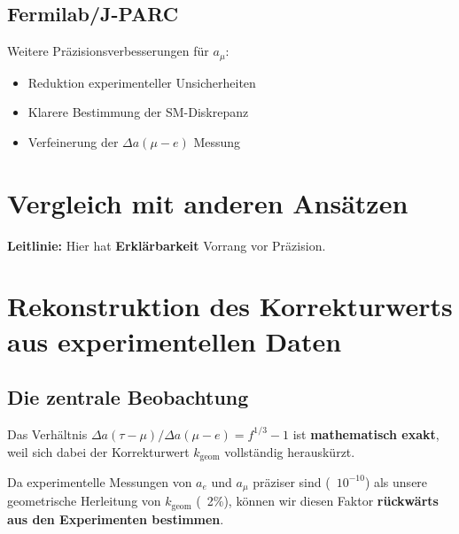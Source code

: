 	\subsection{Fermilab/J-PARC}
	
	Weitere Präzisionsverbesserungen für $a_\mu$:
	\begin{itemize}
		\item Reduktion experimenteller Unsicherheiten
		\item Klarere Bestimmung der SM-Diskrepanz
		\item Verfeinerung der $\Delta a(\mu - e)$ Messung
	\end{itemize}
	
	\section{Vergleich mit anderen Ansätzen}
	
	\begin{table}[h]
		\centering
		\caption{Vergleich verschiedener Ansätze}
	\end{table}
	
	\textbf{Leitlinie:} Hier hat \textbf{Erklärbarkeit} Vorrang vor Präzision.
	\section{Rekonstruktion des Korrekturwerts aus experimentellen Daten}
	
	\subsection{Die zentrale Beobachtung}
	
	Das Verhältnis $\Delta a(\tau-\mu) / \Delta a(\mu-e) = f^{1/3} - 1$ ist \textbf{mathematisch exakt}, weil sich dabei der Korrekturwert $k_{\text{geom}}$ vollständig herauskürzt.
	
	Da experimentelle Messungen von $a_e$ und $a_\mu$ präziser sind (~$10^{-10}$) als unsere geometrische Herleitung von $k_{\text{geom}}$ (~2\%), können wir diesen Faktor \textbf{rückwärts aus den Experimenten bestimmen}.
	
